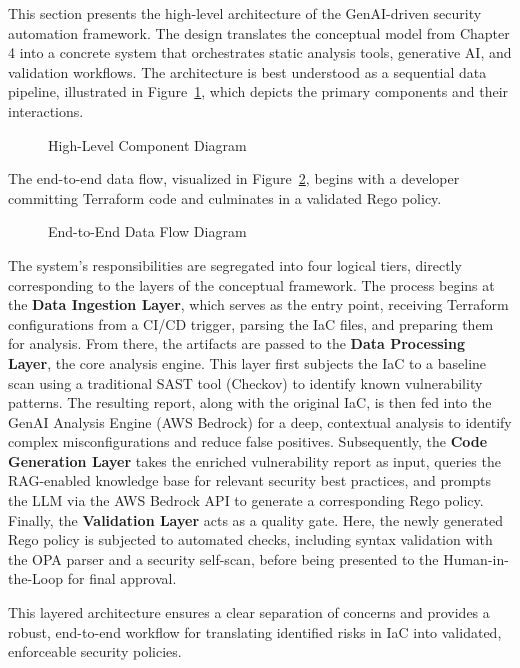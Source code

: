 This section presents the high-level architecture of the GenAI-driven security automation framework. The design translates the conceptual model from Chapter 4 into a concrete system that orchestrates static analysis tools, generative AI, and validation workflows. The architecture is best understood as a sequential data pipeline, illustrated in Figure~\ref{fig:component_diagram}, which depicts the primary components and their interactions.

\begin{figure}[h!]
\centering
\caption{High-Level Component Diagram}
\label{fig:component_diagram}
\end{figure}

The end-to-end data flow, visualized in Figure~\ref{fig:data_flow_diagram}, begins with a developer committing Terraform code and culminates in a validated Rego policy.

\begin{figure}[h!]
\centering
\caption{End-to-End Data Flow Diagram}
\label{fig:data_flow_diagram}
\end{figure}

The system's responsibilities are segregated into four logical tiers, directly corresponding to the layers of the conceptual framework. The process begins at the \textbf{Data Ingestion Layer}, which serves as the entry point, receiving Terraform configurations from a CI/CD trigger, parsing the IaC files, and preparing them for analysis. From there, the artifacts are passed to the \textbf{Data Processing Layer}, the core analysis engine. This layer first subjects the IaC to a baseline scan using a traditional SAST tool (Checkov) to identify known vulnerability patterns. The resulting report, along with the original IaC, is then fed into the GenAI Analysis Engine (AWS Bedrock) for a deep, contextual analysis to identify complex misconfigurations and reduce false positives. Subsequently, the \textbf{Code Generation Layer} takes the enriched vulnerability report as input, queries the RAG-enabled knowledge base for relevant security best practices, and prompts the LLM via the AWS Bedrock API to generate a corresponding Rego policy. Finally, the \textbf{Validation Layer} acts as a quality gate. Here, the newly generated Rego policy is subjected to automated checks, including syntax validation with the OPA parser and a security self-scan, before being presented to the Human-in-the-Loop for final approval.

This layered architecture ensures a clear separation of concerns and provides a robust, end-to-end workflow for translating identified risks in IaC into validated, enforceable security policies.

